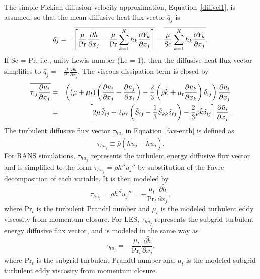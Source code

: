 The simple Fickian diffusion velocity approximation, Equation~\ref{diffvel1},
is assumed, so that the mean diffusive heat flux vector $\bar{q}_j$ is
%
\begin{eqnarray}
  \bar{q}_j = - \overline{ \left[ {\mu \over {\rm Pr}}
                       {{\partial h} \over {\partial x_j}}
                 -  {\mu \over {\rm Pr}} 
        \sum_{k=1}^K h_k {{\partial Y_k} \over {\partial x_j}} \right] }
     - \overline{ {\mu \over {\rm Sc}}
        \sum_{k=1}^K h_k {{\partial Y_k} \over {\partial x_j}} }.
\end{eqnarray}
%
If Sc = Pr, i.e., unity Lewis number (Le = 1), then the diffusive heat
flux vector simplifies to $\bar{q}_j = -\frac{\mu}{\mathrm{Pr}}
\frac{\partial \tilde{h}}{\partial x_j}$.  The viscous dissipation 
term is closed by
%
\begin{eqnarray}
\overline{\tau_{ij} {{\partial u_i} \over {\partial x_j }}}
  &=& \left(\left(\mu + \mu_t\right) \left( {{\partial \tilde{u}_i} 
      \over {\partial x_j}}
    + {{\partial \tilde{u}_j} \over {\partial x_i}} \right)
    - {2 \over 3} \left( \bar{\rho} \tilde{k} + 
      \mu_t{{\partial \tilde{u}_k} \over {\partial x_k}} \right)
      \delta_{ij} \right) {{\partial \tilde{u}_i} \over {\partial x_j}}
      \nonumber \\
  &=& \left[ 2 \mu \tilde{S}_{ij} 
    + 2 \mu_t \left( \tilde{S}_{ij} - \frac{1}{3} \tilde{S}_{kk}
      \delta_{ij} \right) - \frac{2}{3} \bar{\rho} \tilde{k}
      \delta_{ij} \right] \frac{\partial \tilde{u}_i}{\partial x_j}.
\end{eqnarray}
%
The turbulent diffusive flux vector $\tau_{h u_j}$ in Equation~\ref{fav-enth}
is defined as
%
\begin{equation}
\tau_{h u_j} \equiv \bar{\rho} \left( \widetilde{h u_j} - 
     \tilde{h} \tilde{u}_j \right).
\end{equation}
%
For RANS simulations, $\tau_{h u_j}$ represents the turbulent energy 
diffusive flux vector and is simplified to the form 
$\tau_{h u_j} = \overline{\rho h'' u_j''}$ by substitution of the 
Favre decomposition of each variable.  It is then modeled by
%
\begin{equation}
\tau_{h u_j} = \overline{\rho h'' u_j''}
   = - \frac{\mu_t}{\mathrm{Pr}_t} \frac{\partial \tilde{h}}{\partial x_j},
\end{equation}
%
where $\mathrm{Pr}_t$ is the turbulent Prandtl number and $\mu_t$ is 
the modeled turbulent eddy viscosity from momentum closure.  For LES, 
$\tau_{h u_j}$ represents
the subgrid turbulent energy diffusive flux vector, and is modeled in the
same way as
%
\begin{equation}
\tau_{h u_j} = - \frac{\mu_t}{\mathrm{Pr}_t} \frac{\partial 
     \tilde{h}}{\partial x_j},
\end{equation}
%
where $\mathrm{Pr}_t$ is the subgrid turbulent Prandtl number and $\mu_t$
is the modeled subgrid turbulent eddy viscosity from momentum closure.

